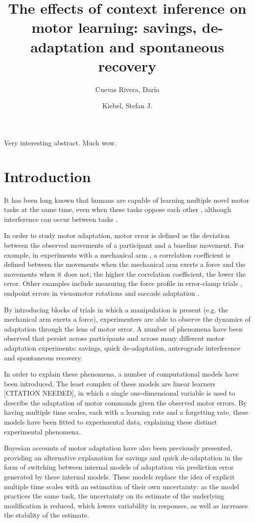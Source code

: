 \documentclass[a4paper,doc,floatsintext,natbib]{apa6}
\title{The effects of context inference on motor learning: savings, de-adaptation and spontaneous recovery}
\author[1]{Cuevas Rivera, Darío}
\author[1]{Kiebel, Stefan J.}
\affil[1]{Chair of Neuroimaging, Faculty of Psychology. Technische Universität Dresden, 01062 Dresden, Germany.}
\affiliation{~}
\begin{document}
\maketitle

Very interesting abstract. Much wow.

\section{Introduction}
It has been long known that humans are capable of learning multiple novel motor tasks at the same time, even when these tasks oppose each other \cite[e.g.][]{Gandolfo_Motor_1996,Shadmehr_Functional_1997,}, although interference can occur between tasks \cite[e.g.][]{Brashers-Krug_Consolidation_1996,Sing_Reduction_2010}.

In order to study motor adaptation, motor error is defined as the deviation between the observed movements of a participant and a baseline movement. For example, in experiments with a mechanical arm \cite[e.g.][]{Gandolfo_Motor_1996}, a correlation coefficient is defined between the movements when the mechanical arm exerts a force and the movements when it does not; the higher the correlation coefficient, the lower the error. Other examples include measuring the force profile in error-clamp trials \cite{Smith_Interacting_2006}, endpoint errors in visuomotor rotations \cite{Kim_Neural_2015} and saccade adaptation \cite{Catz_Cerebellardependent_2008}.

By introducing blocks of trials in which a manipulation is present (e.g. the mechanical arm exerts a force), experimenters are able to observe the dynamics of adaptation through the lens of motor error. A number of phenomena have been observed that persist across participants and across many different motor adaptation experiments: savings, quick de-adaptation, anterograde interference and spontaneous recovery.

In order to explain these phenomena, a number of computational models have been introduced. The least complex of these models are linear learners [CITATION NEEDED], in which a single one-dimensional variable is used to describe the adaptation of motor commands given the observed motor errors. By having multiple time scales, each with a learning rate and a forgetting rate, these models have been fitted to experimental data, explaining these distinct experimental phenomena.

Bayesian accounts of motor adaptation have also been previously presented, providing an alternative explanation for savings and quick de-adaptation in the form of switching between internal models of adaptation via prediction error generated by these internal models. These models replace the idea of explicit multiple time scales with an estimation of their own uncertainty: as the model practices the same task, the uncertainty on its estimate of the underlying modification is reduced, which lowers variability in responses, as well as increases the stability of the estimate.
\end{document}
